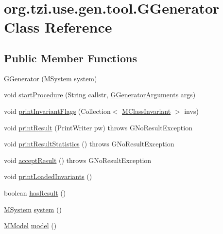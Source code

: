 \hypertarget{classorg_1_1tzi_1_1use_1_1gen_1_1tool_1_1_g_generator}{\section{org.\-tzi.\-use.\-gen.\-tool.\-G\-Generator Class Reference}
\label{classorg_1_1tzi_1_1use_1_1gen_1_1tool_1_1_g_generator}
}
\subsection*{Public Member Functions}
\begin{DoxyCompactItemize}
\item 
\hyperlink{classorg_1_1tzi_1_1use_1_1gen_1_1tool_1_1_g_generator_a2dda0d165f0cb3fa673d7eb935e491c0}{G\-Generator} (\hyperlink{classorg_1_1tzi_1_1use_1_1uml_1_1sys_1_1_m_system}{M\-System} \hyperlink{classorg_1_1tzi_1_1use_1_1gen_1_1tool_1_1_g_generator_a2249b27a096e2e36707f66a0860ed5f0}{system})
\item 
void \hyperlink{classorg_1_1tzi_1_1use_1_1gen_1_1tool_1_1_g_generator_a6602b85d34729ca5e40c3ebee8e3f645}{start\-Procedure} (String callstr, \hyperlink{classorg_1_1tzi_1_1use_1_1gen_1_1tool_1_1_g_generator_arguments}{G\-Generator\-Arguments} args)
\item 
void \hyperlink{classorg_1_1tzi_1_1use_1_1gen_1_1tool_1_1_g_generator_a26d1d12e486cb303b842207a148f5610}{print\-Invariant\-Flags} (Collection$<$ \hyperlink{classorg_1_1tzi_1_1use_1_1uml_1_1mm_1_1_m_class_invariant}{M\-Class\-Invariant} $>$ invs)
\item 
void \hyperlink{classorg_1_1tzi_1_1use_1_1gen_1_1tool_1_1_g_generator_a584def88fcaf8ec28cac7486a643a1de}{print\-Result} (Print\-Writer pw)  throws G\-No\-Result\-Exception 
\item 
void \hyperlink{classorg_1_1tzi_1_1use_1_1gen_1_1tool_1_1_g_generator_a2419f3fe02c327facbb58e610bcb4371}{print\-Result\-Statistics} ()  throws G\-No\-Result\-Exception 
\item 
void \hyperlink{classorg_1_1tzi_1_1use_1_1gen_1_1tool_1_1_g_generator_a77d58c674dd8bb52e12b08d3919066d2}{accept\-Result} ()  throws G\-No\-Result\-Exception 
\item 
void \hyperlink{classorg_1_1tzi_1_1use_1_1gen_1_1tool_1_1_g_generator_a3baf47d77b1fd564639213549d19054d}{print\-Loaded\-Invariants} ()
\item 
boolean \hyperlink{classorg_1_1tzi_1_1use_1_1gen_1_1tool_1_1_g_generator_aeebf190c153734cd1d80800970e8046a}{has\-Result} ()
\item 
\hyperlink{classorg_1_1tzi_1_1use_1_1uml_1_1sys_1_1_m_system}{M\-System} \hyperlink{classorg_1_1tzi_1_1use_1_1gen_1_1tool_1_1_g_generator_a2249b27a096e2e36707f66a0860ed5f0}{system} ()
\item 
\hyperlink{classorg_1_1tzi_1_1use_1_1uml_1_1mm_1_1_m_model}{M\-Model} \hyperlink{classorg_1_1tzi_1_1use_1_1gen_1_1tool_1_1_g_generator_a26b72646c439c6720d41e7ab84a7ee54}{model} ()
\end{DoxyCompactItemize}
